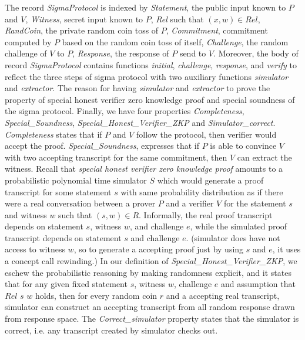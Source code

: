 \noindent
The record \textit{SigmaProtocol} is indexed by \textit{Statement}, the public input 
known to $P$ and $V$, \textit{Witness}, secret input known to $P$, 
\textit{Rel} such that $(x, w) \in Rel$, \textit{RandCoin}, the private 
random coin toss of $P$, \textit{Commitment}, commitment computed 
by $P$ based on the random coin toss of itself, 
\textit{Challenge}, the random challenge of $V$ to $P$, 
\textit{Response}, the response of $P$ send to $V$. Moreover, 
the body of record \textit{SigmaProtocol} contains
functions \textit{initial}, \textit{challenge}, \textit{response}, and \textit{verify}
to reflect the three steps of sigma protocol with two auxiliary 
functions \textit{simulator} and \textit{extractor}.  The 
reason for having \textit{simulator} and \textit{extractor} 
to prove the property of special honest verifier zero knowledge proof 
and special soundness of 
the sigma protocol. Finally, we have four properties \textit{Completeness}, 
\textit{Special\_Soundness}, \textit{Special\_Honest\_Verifier\_ZKP}
and \textit{Simulator\_correct}. 
\textit{Completeness} states that if $P$ and $V$ follow the protocol, then 
verifier would accept the proof. \textit{Special\_Soundness},
expresses that if $P$ is able to convince $V$ with two 
accepting transcript for the same commitment, then $V$ can extract the witness.
Recall that \textit{special honest 
verifier zero knowledge proof} amounts to a probabilistic polynomial time simulator 
$S$ which would generate a proof transcript for some statement 
$s$  with same probability distribution as if there were a real 
conversation between a prover $P$ and a verifier $V$ 
for the statement $s$ and witness $w$ such that $(s, w) \in  R$.
Informally, the real proof transcript depends on statement $s$, witness $w$,  
and challenge $e$, 
while the simulated proof transcript depends on statement $s$ and challenge $e$. 
(simulator does have not access to witness $w$, so to generate a accepting 
proof just by using $s$ and $e$, it uses a concept call rewinding.)
In our definition of \textit{Special\_Honest\_Verifier\_ZKP}, we eschew the 
probabilistic reasoning by making randomness explicit, and it
states that for any  given 
fixed statement $s$, witness $w$, challenge $e$ and assumption that $Rel$ $s$ $w$ holds, 
then for every random coin $r$  and a accepting real transcript, simulator can construct 
an accepting transcript from all random response drawn from response space. 
The \textit{Correct\_simulator} property states that the simulator is correct, i.e.
any transcript created by simulator checks out. 



